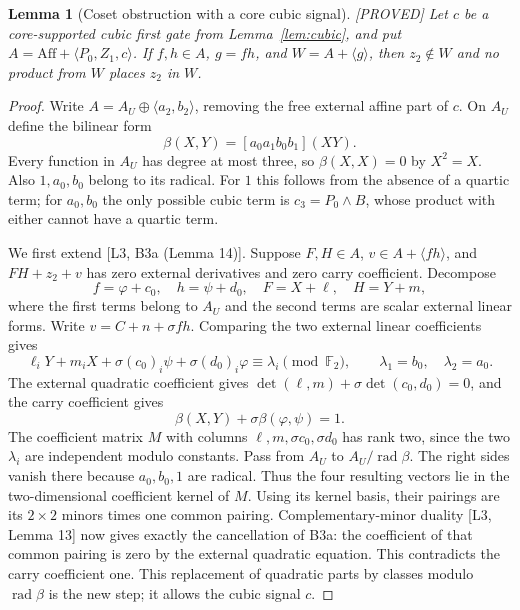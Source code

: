 \documentclass[11pt,a4paper]{article}
\newtheorem{lemma}[theorem]{Lemma}
\newcommand{\Aff}{\mathrm{Aff}}
\newcommand{\status}[1]{\hfill\textsf{[#1]}}
\begin{document}
\begin{lemma}[Coset obstruction with a core cubic signal]\label{lem:corecoset}\status{PROVED}
Let $c$ be a core-supported cubic first gate from Lemma~\ref{lem:cubic}, and put $A=\Aff+\langle P_0,Z_1,c\rangle$. If $f,h\in A$, $g=fh$, and $W=A+\langle g\rangle$, then $z_2\notin W$ and no product from $W$ places $z_2$ in $W$.
\end{lemma}
\begin{proof}
Write $A=A_U\oplus\langle a_2,b_2\rangle$, removing the free external affine part of $c$. On $A_U$ define the bilinear form
\[
\beta(X,Y)=[a_0a_1b_0b_1](XY).
\]
Every function in $A_U$ has degree at most three, so $\beta(X,X)=0$ by $X^2=X$. Also $1,a_0,b_0$ belong to its radical. For $1$ this follows from the absence of a quartic term; for $a_0,b_0$ the only possible cubic term is $c_3=P_0\wedge B$, whose product with either cannot have a quartic term.

We first extend [L3, B3a (Lemma 14)]. Suppose $F,H\in A$, $v\in A+\langle fh\rangle$, and $FH+z_2+v$ has zero external derivatives and zero carry coefficient. Decompose
\[
f=\varphi+c_0,\quad h=\psi+d_0,\quad F=X+\ell,\quad H=Y+m,
\]
where the first terms belong to $A_U$ and the second terms are scalar external linear forms. Write $v=C+n+\sigma fh$. Comparing the two external linear coefficients gives
\[
\ell_iY+m_iX+\sigma(c_0)_i\psi+\sigma(d_0)_i\varphi
\equiv\lambda_i\pmod{\mathbb F_2},\qquad
\lambda_1=b_0,\quad\lambda_2=a_0.
\]
The external quadratic coefficient gives $\det(\ell,m)+\sigma\det(c_0,d_0)=0$, and the carry coefficient gives
\[
\beta(X,Y)+\sigma\beta(\varphi,\psi)=1.
\]
The coefficient matrix $M$ with columns $\ell,m,\sigma c_0,\sigma d_0$ has rank two, since the two $\lambda_i$ are independent modulo constants. Pass from $A_U$ to $A_U/\operatorname{rad}\beta$. The right sides vanish there because $a_0,b_0,1$ are radical. Thus the four resulting vectors lie in the two-dimensional coefficient kernel of $M$. Using its kernel basis, their pairings are its $2\times2$ minors times one common pairing. Complementary-minor duality [L3, Lemma 13] now gives exactly the cancellation of B3a: the coefficient of that common pairing is zero by the external quadratic equation. This contradicts the carry coefficient one. This replacement of quadratic parts by classes modulo $\operatorname{rad}\beta$ is the new step; it allows the cubic signal $c$.


\end{proof}
\end{document}
